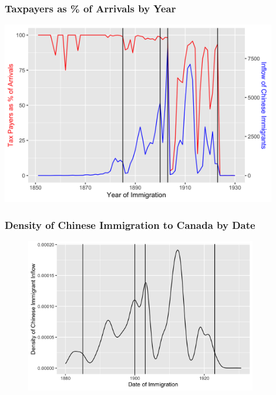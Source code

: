 \documentclass[pdf]{beamer}
\begin{document}
\begin{frame}[label=taxbyyear]
    \frametitle{Taxpayers as \% of Arrivals by Year}
    \centering
    \includegraphics[width = 0.9\textwidth]{../../figs/taxbyyear.png}
    \hyperlink{yrimmchi}{}
\end{frame}


\begin{frame}[label = yrimmchi_means]
	\frametitle{Density of Chinese Immigration to Canada by Date}
    \centering
	\begin{figure}[H]
		\begin{center}
			\includegraphics[width=0.9\textwidth]{../../figs/dateimmchi.png}
		\end{center}
	\end{figure}
    \hyperlink{yrimmchi}{}
\end{frame}
\end{document}
